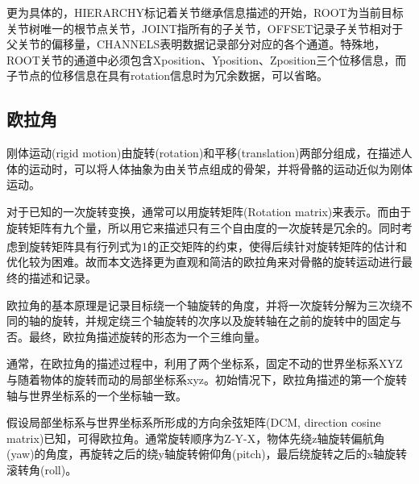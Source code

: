 更为具体的，HIERARCHY标记着关节继承信息描述的开始，ROOT为当前目标关节树唯一的根节点关节，JOINT指所有的子关节，OFFSET记录子关节相对于父关节的偏移量，CHANNELS表明数据记录部分对应的各个通道。特殊地，ROOT关节的通道中必须包含Xposition、Yposition、Zposition三个位移信息，而子节点的位移信息在具有rotation信息时为冗余数据，可以省略。

\subsection{欧拉角}{}
刚体运动(rigid motion)由旋转(rotation)和平移(translation)两部分组成，在描述人体的运动时，可以将人体抽象为由关节点组成的骨架，并将骨骼的运动近似为刚体运动。

对于已知的一次旋转变换，通常可以用旋转矩阵(Rotation matrix)来表示。而由于旋转矩阵有九个量，所以用它来描述只有三个自由度的一次旋转是冗余的。同时考虑到旋转矩阵具有行列式为1的正交矩阵的约束\textsuperscript{\cite{p18}}，使得后续针对旋转矩阵的估计和优化较为困难。故而本文选择更为直观和简洁的欧拉角来对骨骼的旋转运动进行最终的描述和记录。

欧拉角的基本原理是记录目标绕一个轴旋转的角度，并将一次旋转分解为三次绕不同的轴的旋转，并规定绕三个轴旋转的次序以及旋转轴在之前的旋转中的固定与否。最终，欧拉角描述旋转的形态为一个三维向量。

通常，在欧拉角的描述过程中，利用了两个坐标系，固定不动的世界坐标系XYZ与随着物体的旋转而动的局部坐标系xyz。初始情况下，欧拉角描述的第一个旋转轴与世界坐标系的一个坐标轴一致。

假设局部坐标系与世界坐标系所形成的方向余弦矩阵(DCM, direction cosine matrix)已知，可得欧拉角。通常旋转顺序为Z-Y-X，物体先绕z轴旋转偏航角(yaw)的角度，再旋转之后的绕y轴旋转俯仰角(pitch)，最后绕旋转之后的x轴旋转滚转角(roll)。
